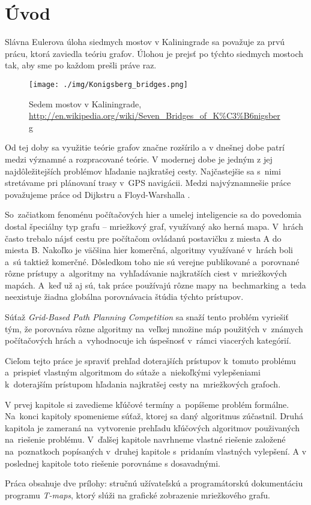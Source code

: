 \chapter*{Úvod}

Slávna Eulerova úloha siedmych mostov v Kaliningrade \cite{euler41} sa považuje za prvú prácu, 
ktorá zaviedla teóriu grafov.
Úlohou je prejsť po týchto siedmych mostoch tak, aby sme po každom prešli práve raz.


\begin{figure}[h]
\centering
\texttt{[image: ./img/Konigsberg\_bridges.png]}
\caption{Sedem mostov v Kaliningrade, \url{http://en.wikipedia.org/wiki/Seven_Bridges_of_K\%C3\%B6nigsberg}}
\label{fig:konigsberg_bridges}
\end{figure}

 
Od tej doby sa využitie teórie grafov značne
rozšírilo a v dnešnej dobe patrí medzi významné
a rozpracované teórie. V modernej dobe je jedným z jej 
naj\-dô\-le\-ži\-tej\-ších 
problémov hľadanie najkratšej cesty. Najčastejšie sa s~nimi stretávame pri plánovaní trasy v~GPS navigácii.
Medzi najvýznamnešie práce považujeme práce od Dijkstru \cite{dijkstra59} a Floyd-Warshalla \cite{floyd62}.

So~začiatkom fenoménu počítačových hier 
a umelej inteligencie sa do povedomia dostal špeciálny typ grafu --
mriežkový graf, využívaný ako herná mapa.
V~hrách často trebalo nájsť cestu pre počítačom
ovládanú postavičku z miesta A do miesta B.
Nakoľko je väčšina hier komerčná, algoritmy
využívané v~hrách boli a~sú taktiež komerčné.
Dôsledkom toho nie sú verejne publikované a~porovnané rôzne prístupy a~algoritmy
na~vyhľadávanie najkratších ciest v~mriežkových mapách. A~keď už aj sú, tak práce používajú rôzne mapy
na~bechmarking a~teda neexistuje žiadna globálna porovnávacia štúdia týchto prístupov.

Súťaž {\sl Grid-Based Path Planning Competition}
 \cite{sturtevantgppc} sa snaží tento problém vyriešiť tým, že porovnáva rôzne algoritmy na~veľkej množine máp
použitých v~známych počítačových hrách a~vyhodnocuje ich úspešnosť v~rámci viacerých kategórií.

Cieľom tejto práce je spraviť prehľad doterajších prístupov k~tomuto problému a~prispieť vlastným algoritmom do sútaže a~niekoľkými vylepšeniami k~doterajším prístupom hľadania najkratšej cesty na~mriežkových grafoch.

V prvej kapitole si zavedieme kľúčové termíny a~popíšeme problém formálne. Na~konci kapitoly spomenieme súťaž, ktorej sa daný algoritmus zúčastnil.
Druhá kapitola je zameraná na~vytvorenie prehľadu kľúčových algoritmov použivaných na~riešenie problému.
V~ďalšej kapitole navrhneme vlastné riešenie založené na~poznatkoch popísaných v~druhej kapitole s~pridaním vlastných vylepšení.
A v poslednej kapitole toto riešenie porovnáme s dosavadnými.

Práca obsahuje dve prílohy: stručnú užívateľskú a programátorskú dokumentáciu programu \emph{T-maps}, ktorý slúži na grafické zobrazenie mriežkového grafu.

